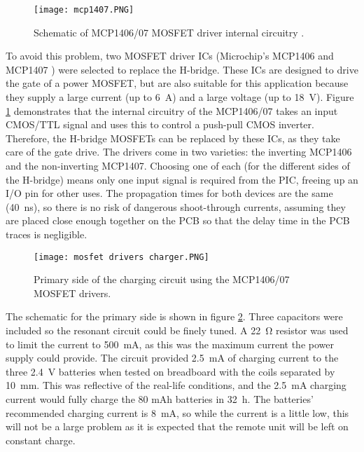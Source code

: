 \begin{figure}[htb]
	\centering
	\texttt{[image: mcp1407.PNG]}
	\caption{Schematic of MCP1406/07 MOSFET driver internal circuitry \cite{mcp1407}.}
	\label{fig: mcp1407}
\end{figure}

To avoid this problem, two MOSFET driver ICs (Microchip's MCP1406 and MCP1407 \cite{mcp1407}) were selected to replace the H-bridge. These ICs are designed to drive the gate of a power MOSFET, but are also suitable for this application because they supply a large current (up to \SI{6}{\ampere}) and a large voltage (up to \SI{18}{\volt}). Figure \ref{fig: mcp1407} demonstrates that the internal circuitry of the MCP1406/07 takes an input CMOS/TTL signal and uses this to control a push-pull CMOS inverter. Therefore, the H-bridge MOSFETs can be replaced by these ICs, as they take care of the gate drive. The drivers come in two varieties: the inverting MCP1406 and the non-inverting MCP1407. Choosing one of each (for the different sides of the H-bridge) means only one input signal is required from the PIC, freeing up an I/O pin for other uses. The propagation times for both devices are the same (\SI{40}{\nano\second}), so there is no risk of dangerous shoot-through currents, assuming they are placed close enough together on the PCB so that the delay time in the PCB traces is negligible.\\

\begin{figure}[htb]
	\centering
	\texttt{[image: mosfet drivers charger.PNG]}
	\caption{Primary side of the charging circuit using the MCP1406/07 MOSFET drivers.}
	\label{fig: mosfet drivers charger}
\end{figure}

The schematic for the primary side is shown in figure \ref{fig: mosfet drivers charger}. Three capacitors were included so the resonant circuit could be finely tuned. A \SI{22}{\ohm} resistor was used to limit the current to \SI{500}{\milli\ampere}, as this was the maximum current the power supply could provide. The circuit provided \SI{2.5}{\milli\ampere} of charging current to the three \SI{2.4}{\volt} batteries when tested on breadboard with the coils separated by \SI{10}{\milli\metre}. This was reflective of the real-life conditions, and the \SI{2.5}{\milli\ampere} charging current would fully charge the 80 mAh batteries in \SI{32}{\hour}. The batteries' recommended charging current is \SI{8}{\milli\ampere}, so while the current is a little low, this will not be a large problem as it is expected that the remote unit will be left on constant charge.\\

